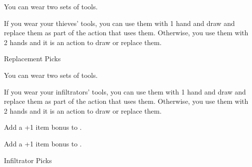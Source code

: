 


{\footnotesize
You can wear two sets of tools.

If you wear your thieves' tools, you can use them with 1 hand and draw and replace them as part of the action that uses them.
Otherwise, you use them with 2 hands and it is an action to draw or replace them.
}


Replacement Picks \ItemPrice{3sp}

\vfill

\hfill{}



{\footnotesize
You can wear two sets of tools.

If you wear your infiltrators' tools, you can use them with 1 hand and draw and replace them as part of the action that uses them.
Otherwise, you use them with 2 hands and it is an action to draw or replace them.
}


Add a +1 item bonus to .


Add a +1 item bonus to .

Infiltrator Picks 

\vfill

\hfill{}

